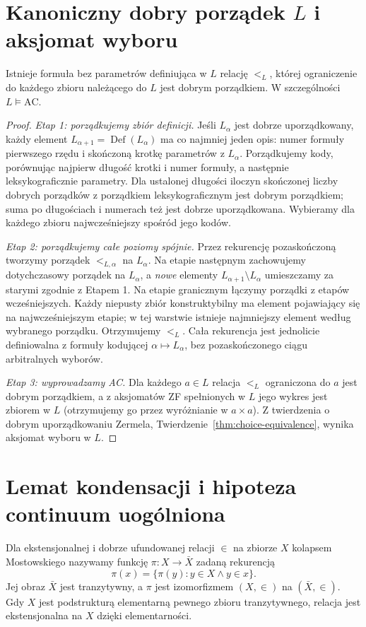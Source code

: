\section{Kanoniczny dobry porządek \texorpdfstring{$L$}{L} i aksjomat wyboru}
\label{sec:l-choice}
\begin{twierdzenie}
\label{thm:l-definable-wellorder}
Istnieje formuła bez parametrów definiująca w $L$
relację $<_{L}$, której ograniczenie do każdego
zbioru należącego do $L$ jest dobrym porządkiem.
W szczególności $L\models\mathrm{AC}$.
\end{twierdzenie}
\begin{proof}
\emph{Etap 1: porządkujemy zbiór definicji.}
Jeśli $L_\alpha$ jest dobrze uporządkowany,
każdy element $L_{\alpha+1}=\operatorname{Def}(L_\alpha)$
ma co najmniej jeden opis: numer formuły pierwszego
rzędu i skończoną krotkę parametrów z $L_\alpha$.
Porządkujemy kody, porównując najpierw długość
krotki i numer formuły, a następnie leksykograficznie
parametry. Dla ustalonej długości iloczyn skończonej
liczby dobrych porządków z porządkiem leksykograficznym
jest dobrym porządkiem; suma po długościach i numerach
też jest dobrze uporządkowana. Wybieramy dla każdego
zbioru najwcześniejszy spośród jego kodów.

\emph{Etap 2: porządkujemy całe poziomy spójnie.}
Przez rekurencję pozaskończoną tworzymy porządek
$<_{L,\alpha}$ na $L_\alpha$. Na etapie następnym
zachowujemy dotychczasowy porządek na $L_\alpha$,
a \emph{nowe} elementy $L_{\alpha+1}\setminus L_\alpha$
umieszczamy za starymi zgodnie z Etapem 1.
Na etapie granicznym łączymy porządki z etapów
wcześniejszych. Każdy niepusty zbiór konstruktybilny
ma element pojawiający się na najwcześniejszym etapie;
w tej warstwie istnieje najmniejszy element według
wybranego porządku. Otrzymujemy $<_{L}$.
Cała rekurencja jest jednolicie definiowalna z
formuły kodującej $\alpha\mapsto L_\alpha$,
bez pozaskończonego ciągu arbitralnych wyborów.

\emph{Etap 3: wyprowadzamy AC.}
Dla każdego $a\in L$ relacja $<_{L}$ ograniczona do
$a$ jest dobrym porządkiem, a z aksjomatów ZF
spełnionych w $L$ jego wykres jest zbiorem w $L$
(otrzymujemy go przez wyróżnianie w $a\times a$).
Z twierdzenia o dobrym uporządkowaniu Zermela,
Twierdzenie~\ref{thm:choice-equivalence},
wynika aksjomat wyboru w $L$.
\end{proof}

\section{Lemat kondensacji i hipoteza continuum uogólniona}
\label{sec:l-condensation-gch}
\begin{definicja}
\label{def:l-mostowski-collapse}
Dla ekstensjonalnej i dobrze ufundowanej relacji
$\in$ na zbiorze $X$ kolapsem Mostowskiego nazywamy
funkcję $\pi:X\to\bar X$ zadaną rekurencją
\[
\pi(x)=\{\pi(y):y\in X\land y\in x\}.
\]
Jej obraz $\bar X$ jest tranzytywny, a $\pi$ jest
izomorfizmem $(X,\in)$ na $(\bar X,\in)$.
Gdy $X$ jest podstrukturą elementarną pewnego
zbioru tranzytywnego, relacja jest ekstensjonalna
na $X$ dzięki elementarności.
\end{definicja}

